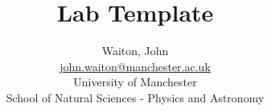 \author{Waiton, John \\ \href{mailto:john.waiton@manchester.ac.uk}{john.waiton@manchester.ac.uk} \\ 
University of Manchester \\ 
School of Natural Sciences - Physics and Astronomy
}
\title{Lab Template }
\date{\vspace{-3ex}}
